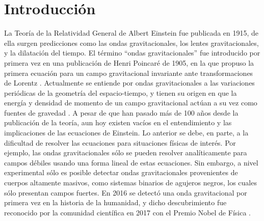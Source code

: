 
%


\newcommand{\keyword}[1]{\textit{#1}}
\newcommand{\sm}[0]{$M_\odot$}


\section{Introducción}
	La Teor\'ia de la Relatividad General de Albert Einstein fue publicada en 1915, de ella surgen predicciones como las ondas gravitacionales, los lentes gravitacionales, y la dilataci\'on del tiempo. El t\'ermino ``ondas gravitacionales'' fue introducido por primera vez en una publicaci\'on de Henri Poincaré de 1905, en la que propuso la primera ecuaci\'on para un campo gravitacional invariante ante transformaciones de Lorentz \cite{straumann2012general, bassan2014advanced}. Actualmente se entiende por ondas gravitacionales a las variaciones periódicas de la geometría del espacio-tiempo, y tienen su origen en que la energía y densidad de momento de un campo gravitacional actúan a su vez como fuentes de gravedad \cite{hoyng2006gravitational}. A pesar de que han pasado más de 100 años desde la publicación de la teoría, aun hoy existen vacíos en el entendimiento y las implicaciones de las ecuaciones de Einstein. Lo anterior se debe, en parte, a la dificultad de resolver las ecuaciones para situaciones físicas de interés. Por ejemplo, las ondas gravitacionales sólo se pueden resolver analíticamente para campos débiles usando una forma lineal de estas ecuaciones. Sin embargo, a nivel experimental s\'olo es posible detectar ondas gravitacionales provenientes de cuerpos altamente masivos, como sistemas binarios de agujeros negros, los cuales s\'olo presentan campos fuertes. En 2016 se detectó una onda gravitacional por primera vez en la historia de la humanidad, y dicho descubrimiento fue reconocido por la comunidad científica en 2017 con el Premio Nobel de Física \cite{brugmann2018fundamentals}.
	
